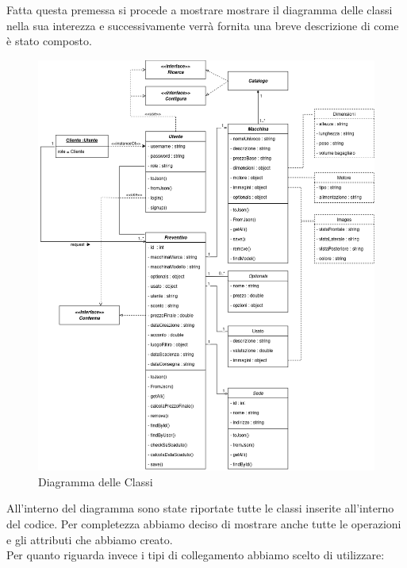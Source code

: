 \documentclass[a4paper, 11pt,oneside]{book}
\newcommand{\spacing}{\par\bigskip\noindent}
\begin{document}
    Fatta questa premessa si procede a mostrare mostrare il diagramma delle classi nella sua interezza e successivamente verrà fornita una breve descrizione di come è stato composto.
    \begin{figure}[H]
        \includegraphics[width=\textwidth]{diagramma_delle_classi.png}
        \caption{Diagramma delle Classi}
        \label{fig:diagramma_delle_classi}
    \end{figure}
    \spacing
    All'interno del diagramma sono state riportate tutte le classi inserite all'interno del codice. Per completezza abbiamo deciso di mostrare anche tutte le operazioni e gli attributi che abbiamo creato.\\
    Per quanto riguarda invece i tipi di collegamento abbiamo scelto di utilizzare:
\end{document}
